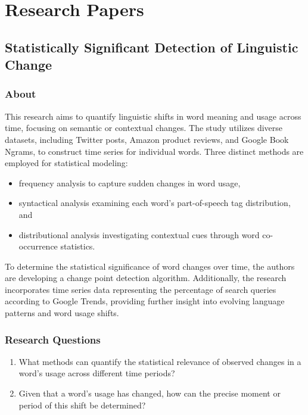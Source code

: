 \documentclass[12pt]{article}
\begin{document}
\newpage
\section{Research Papers} \label{sec:paper}
\subsection{Statistically Significant Detection of Linguistic Change}\label{subsec:statistically-significant-detection-of-linguistic-change}

\subsubsection{About}
This research aims to quantify linguistic shifts in word meaning and usage across time, focusing on semantic or contextual changes.
The study utilizes diverse datasets, including Twitter posts, Amazon product reviews, and Google Book Ngrams, to construct time series for individual words.
Three distinct methods are employed for statistical modeling:
\begin{itemize}
    \item frequency analysis to capture sudden changes in word usage,
    \item syntactical analysis examining each word's part-of-speech tag distribution, and
    \item distributional analysis investigating contextual cues through word co-occurrence statistics.
\end{itemize}
To determine the statistical significance of word changes over time, the authors are developing a change point detection algorithm.
Additionally, the research incorporates time series data representing the percentage of search queries according to Google Trends, providing further insight into evolving language patterns and word usage shifts.

\subsubsection{Research Questions}
\begin{enumerate}
\item What methods can quantify the statistical relevance of observed changes in a word's usage across different time periods?
\item Given that a word's usage has changed, how can the precise moment or period of this shift be determined?
\end{enumerate}
\end{document}
